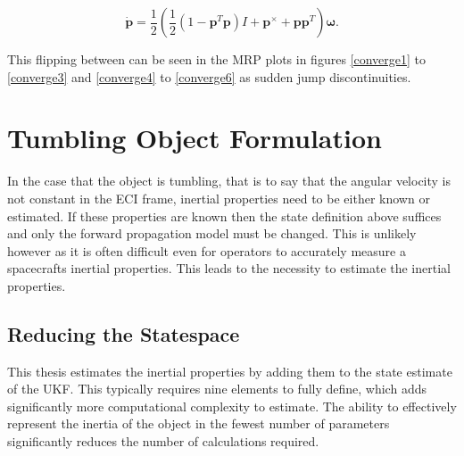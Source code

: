 \begin{equation}
	\dot{\bm{p}} = \frac{1}{2} \left ( \frac{1}{2} (1 - \bm{p}^T\bm{p})I + \bm{p}^{\times} + \bm{p}\bm{p}^T \right )\bm{\omega}.
\end{equation}

This flipping between can be seen in the MRP plots in figures \ref{converge1} to \ref{converge3} and \ref{converge4} to \ref{converge6} as sudden jump discontinuities.

\section{Tumbling Object Formulation}

In the case that the object is tumbling, that is to say that the angular velocity is not constant in the ECI frame, inertial properties need to be either known or estimated. If these properties are known then the state definition above suffices and only the forward propagation model must be changed. This is unlikely however as it is often difficult even for operators to accurately measure a spacecrafts inertial properties. This leads to the necessity to estimate the inertial properties.

\subsection{Reducing the Statespace}

This thesis estimates the inertial properties by adding them to the state estimate of the UKF. This typically requires nine elements to fully define, which adds significantly more computational complexity to estimate. The ability to effectively represent the inertia of the object in the fewest number of parameters significantly reduces the number of calculations required.

